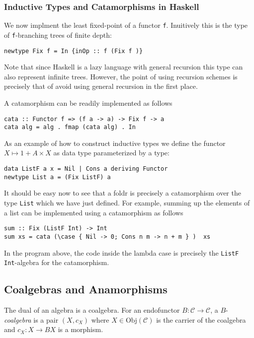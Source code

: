\documentclass{llncs}
\newcommand{\CatC}{\mathcal{C}}
\newcommand{\Obj}{\text{Obj}}
\begin{document}
\subsubsection{Inductive Types and Catamorphisms in Haskell }
We now implment the least fixed-point of a functor \texttt{f}.
Inuitively this is the type of \texttt{f}-branching trees of finite depth:
\begin{verbatim}
newtype Fix f = In {inOp :: f (Fix f )}
\end{verbatim}
Note that since Haskell is a lazy language with general recursion this type can
also represent infinite trees. However, the point of using recursion schemes is
precisely that of avoid using general recursion in the first place.

A catamorphism can be readily implemented as follows
\begin{verbatim}
cata :: Functor f => (f a -> a) -> Fix f -> a
cata alg = alg . fmap (cata alg) . In
\end{verbatim}

As an example of how to construct inductive types we define the functor
$X \mapsto 1 + A \times X$ as data type parameterized by a type:
\begin{verbatim}
data ListF a x = Nil | Cons a deriving Functor
newtype List a = (Fix ListF) a
\end{verbatim}
It should be easy now to see that a foldr is precisely a catamorphism over the
type \texttt{List} which we have just defined.  For example,
summing up the elements of a list can be implemented using a catamorphism as
follows
\begin{verbatim}
sum :: Fix (ListF Int) -> Int
sum xs = cata (\case { Nil -> 0; Cons n m -> n + m } )  xs
\end{verbatim}
In the program above, the code inside the lambda case is precisely the \texttt{ListF Int}-algebra for the catamorphism.

\subsection{Coalgebras and Anamorphisms}
\label{sec:coalg}
The dual of an algebra is a coalgebra. For an endofunctor $B : \CatC \to \CatC$,
a $B$-\emph{coalgebra} is a pair $(X, c_{X})$ where $X \in \Obj(\CatC)$ is the
carrier of the coalgebra and $c_{X} : X \to BX$ is a morphism.
\end{document}
